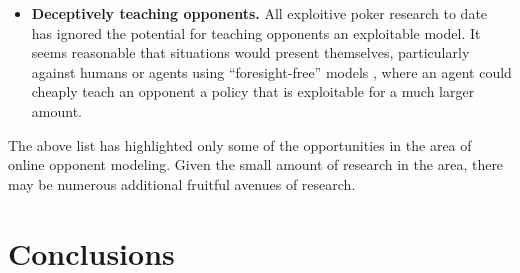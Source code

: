\documentclass{aamas2013}
\begin{document}
\begin{itemize}
\item \textbf{Deceptively teaching opponents.} All exploitive poker research to date has ignored the potential for teaching opponents an exploitable model. It seems reasonable that situations would present themselves, particularly against humans or agents using ``foresight-free'' models \cite{simplemodels}, where an agent could cheaply teach an opponent a policy that is exploitable for a much larger amount.
\end{itemize}

The above list has highlighted only some of the opportunities in the area of online opponent modeling. Given the small amount of research in the area, there may be numerous additional fruitful avenues of research.

\section{Conclusions}

%

%
%

\end{document}
